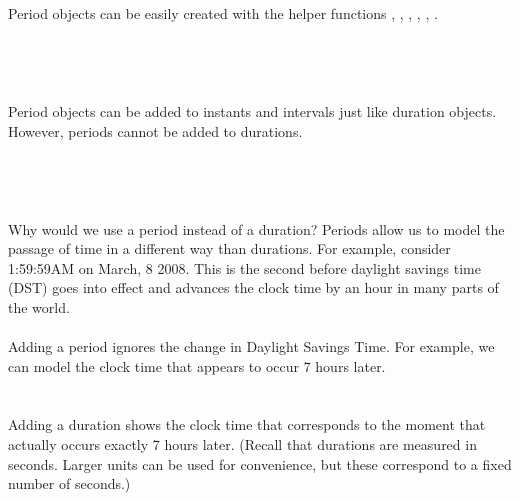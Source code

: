 \documentclass[article]{jss}
\begin{document}
Period objects can be easily created with the helper functions , , , , , . \\

\\
\\

\\
\\

Period objects can be added to instants and intervals just like duration objects. However, periods cannot be added to durations.\\

\\
\\
\\
\\

Why would we use a period instead of a duration? Periods allow us to model the passage of time in a different way than durations. For example, consider 1:59:59AM on March, 8 2008. This is the second before daylight savings time (DST) goes into effect and advances the clock time by an hour in many parts of the world.\\

\\

Adding a period ignores the change in Daylight Savings Time. For example, we can model the clock time that appears to occur 7 hours later.\\

\\
\\

Adding a duration shows the clock time that corresponds to the moment that actually occurs exactly 7 hours later. (Recall that durations are measured in seconds. Larger units can be used for convenience, but these correspond to a fixed number of seconds.)\\

\\
\\
\end{document}
